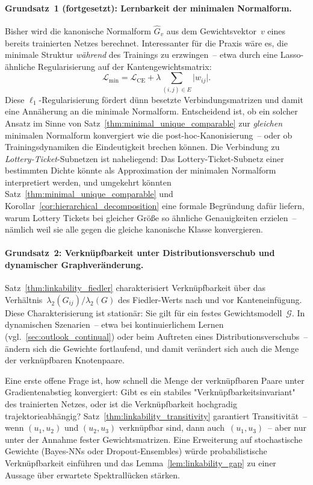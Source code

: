 ﻿\documentclass[12pt, a4paper, openany]{report}
\newcommand{\calG}{\mathcal{G}}
\newcommand{\calL}{\mathcal{L}}
\begin{document}
\paragraph{Grundsatz~1 (fortgesetzt): Lernbarkeit der minimalen Normalform.}
Bisher wird die kanonische Normalform $\hat{G}_v$ aus dem Gewichtsvektor~$v$
eines bereits trainierten Netzes berechnet.  Interessanter für die Praxis
wäre es, die minimale Struktur \textit{während} des Trainings zu erzwingen~--
etwa durch eine Lasso-ähnliche Regularisierung auf der Kantengewichtsmatrix:
\[
  \calL_{\text{min}} = \calL_{\text{CE}} + \lambda \sum_{(i,j)\in E} \bigl|w_{ij}\bigr|.
\]
Diese $\ell_1$-Regularisierung fördert dünn besetzte Verbindungsmatrizen und
damit eine Annäherung an die minimale Normalform.  Entscheidend ist, ob ein
solcher Ansatz im Sinne von Satz~\ref{thm:minimal_unique_comparable} zur
\emph{gleichen} minimalen Normalform konvergiert wie die post-hoc-Kanonisierung~--
oder ob Trainingsdynamiken die Eindeutigkeit brechen können.  Die Verbindung
zu \emph{Lottery-Ticket}-Subnetzen \cite{frankle19} ist naheliegend: Das
Lottery-Ticket-Subnetz einer bestimmten Dichte könnte als Approximation der
minimalen Normalform interpretiert werden, und umgekehrt könnten
Satz~\ref{thm:minimal_unique_comparable} und
Korollar~\ref{cor:hierarchical_decomposition}
eine formale Begründung dafür liefern, warum Lottery Tickets bei gleicher
Größe so ähnliche Genauigkeiten erzielen~-- nämlich weil sie alle gegen die
gleiche kanonische Klasse konvergieren.

\paragraph{Grundsatz~2: Verknüpfbarkeit unter Distributionsverschub und dynamischer Graphveränderung.}
Satz~\ref{thm:linkability_fiedler} charakterisiert Verknüpfbarkeit über das
Verhältnis~$\lambda_2(G_{ij}) / \lambda_2(G)$ des Fiedler-Werts nach und vor
Kanteneinfügung.  Diese Charakterisierung ist stationär: Sie gilt für ein
festes Gewichtsmodell~$\calG$.  In dynamischen Szenarien~-- etwa bei
kontinuierlichem Lernen (vgl.~\cref{sec:outlook_continual}) oder beim
Auftreten eines Distributionsverschubs~-- ändern sich die Gewichte fortlaufend,
und damit verändert sich auch die Menge der verknüpfbaren Knotenpaare.

Eine erste offene Frage ist, how schnell die Menge der verknüpfbaren Paare
unter Gradientenabstieg konvergiert: Gibt es ein stabiles
"Verknüpfbarkeitsinvariant" des trainierten Netzes, oder ist die
Verknüpfbarkeit hochgradig trajektorieabhängig?  Satz~\ref{thm:linkability_transitivity}
garantiert Transitivität~-- wenn $(u_1, u_2)$ und $(u_2, u_3)$ verknüpfbar
sind, dann auch~$(u_1, u_3)$~-- aber nur unter der Annahme fester
Gewichtsmatrizen.  Eine Erweiterung auf stochastische Gewichte (Bayes-NNs
oder Dropout-Ensembles) würde probabilistische Verknüpfbarkeit einführen
und das Lemma~\ref{lem:linkability_gap} zu einer Aussage über erwartete
Spektrallücken stärken.
\end{document}

